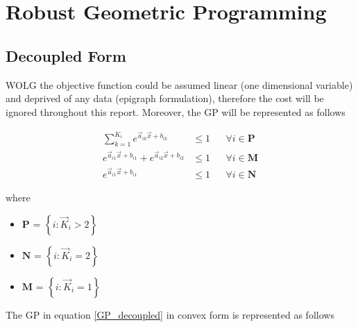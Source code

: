 \section{Robust Geometric Programming}

\subsection{Decoupled Form}
WOLG the objective function could be assumed linear (one dimensional variable) and deprived of any data (epigraph formulation), therefore the cost will be ignored throughout this report. Moreover, the GP will be represented as follows

\begin{equation}
\begin{aligned}
\textstyle{\sum}_{k=1}^{K_i}e^{\vec{a}_{ik}\vec{x} + b_{ik}} &\leq 1 &&\forall i \in \mathbf{P}\\
e^{\vec{a}_{i1}\vec{x} + b_{i1}} + e^{\vec{a}_{i2}\vec{x} + b_{i2}} &\leq 1 &&\forall i \in \mathbf{M}\\
e^{\vec{a}_{i1}\vec{x} + b_{i1}} &\leq 1 &&\forall i \in \mathbf{N}
\end{aligned}
\label{GP_decoupled}
\end{equation}

where
\begin{itemize}
\item $\mathbf{P}$ = $\left\{i : \vec{K}_i > 2\right\}$
\item $\mathbf{N}$ = $\left\{i : \vec{K}_i = 2\right\}$
\item $\mathbf{M}$ = $\left\{i : \vec{K}_i = 1\right\}$
\end{itemize}

The GP in equation \eqref{GP_decoupled} in convex form is represented as follows

